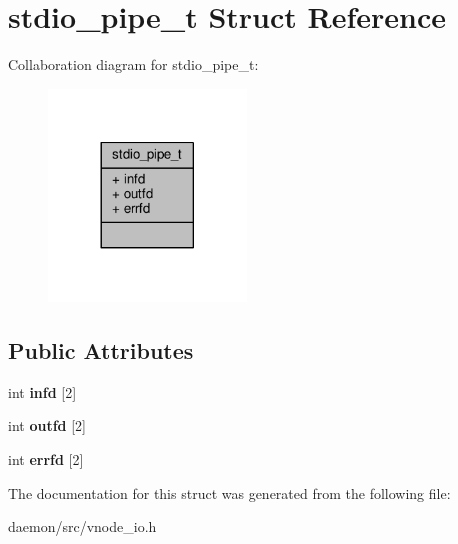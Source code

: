 \hypertarget{structstdio__pipe__t}{\section{stdio\+\_\+pipe\+\_\+t Struct Reference}
\label{structstdio__pipe__t}
}


Collaboration diagram for stdio\+\_\+pipe\+\_\+t\+:
\nopagebreak
\begin{figure}[H]
\begin{center}
\leavevmode
\includegraphics[width=149pt]{structstdio__pipe__t__coll__graph}
\end{center}
\end{figure}
\subsection*{Public Attributes}
\begin{DoxyCompactItemize}
\item 
\hypertarget{structstdio__pipe__t_a0f1676d24cfb83d75222e95f0a08281b}{int {\bfseries infd} \mbox{[}2\mbox{]}}\label{structstdio__pipe__t_a0f1676d24cfb83d75222e95f0a08281b}

\item 
\hypertarget{structstdio__pipe__t_ab20c23bf114a4b42f12d9ec96300a9eb}{int {\bfseries outfd} \mbox{[}2\mbox{]}}\label{structstdio__pipe__t_ab20c23bf114a4b42f12d9ec96300a9eb}

\item 
\hypertarget{structstdio__pipe__t_a7786880d51a40c5c9bc0ba84a3176939}{int {\bfseries errfd} \mbox{[}2\mbox{]}}\label{structstdio__pipe__t_a7786880d51a40c5c9bc0ba84a3176939}

\end{DoxyCompactItemize}


The documentation for this struct was generated from the following file\+:\begin{DoxyCompactItemize}
\item 
daemon/src/vnode\+\_\+io.\+h\end{DoxyCompactItemize}

